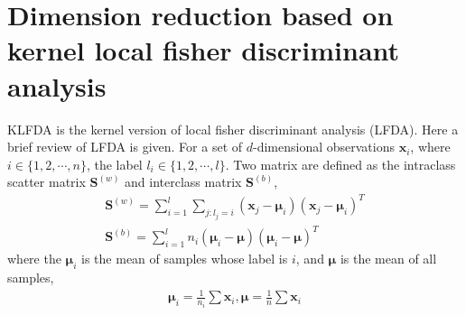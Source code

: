 \documentclass[conference,compsoc]{IEEEtran}
\begin{document}
\section{Dimension reduction based on kernel local fisher discriminant analysis }

KLFDA is the kernel version of local fisher discriminant analysis (LFDA). Here a brief review of LFDA is given. For a set of $d$-dimensional observations $\bm{x}_i$, where $i\in\{1,2,\cdots,n\}$, the label $l_i\in\{1,2,\cdots,l\}$. Two matrix are defined as the intraclass scatter matrix $\bm{S}^{(w)}$ and interclass matrix
$\bm{S}^{(b)}$, 
\begin{equation}
\begin{aligned}
\bm{S}^{(w)} = \mathop{\sum} _{i=1}^l\mathop{\sum}_{j:l_j = i} (\bm{x}_j - \bm{\mu}_i)(\bm{x}_j - \bm{\mu}_i)^T \\
\bm{S}^{(b)} = \mathop{\sum} _{i=1}^l n_i(\bm{\mu}_i - \bm{\mu})(\bm{\mu}_i - \bm{\mu})^T
\end{aligned}
\end{equation}
where the $\bm{\mu}_i$ is the mean of samples whose label is $i$, and $\bm{\mu}$ is the mean of all samples,
\begin{equation}
\begin{aligned}
\bm{\mu}_i = \frac{1}{n_i} \sum \bm{x}_i, 
\bm{\mu} = \frac{1}{n} \sum \bm{x}_i
\end{aligned}
\end{equation}
\end{document}
